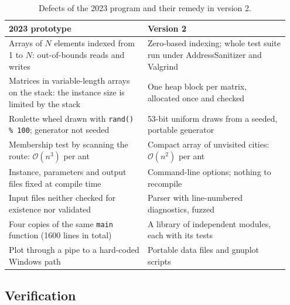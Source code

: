 \documentclass[11pt,a4paper]{article}
\newcommand{\code}[1]{\texttt{#1}}
\newcommand{\bigO}{\mathcal{O}}
\begin{document}
\begin{table}[htbp]
    \centering
    \caption{Defects of the 2023 program and their remedy in version 2.}
    \label{tab:rewrite}
    \small
    \begin{tabular}{@{}p{0.47\linewidth}p{0.48\linewidth}@{}}
        \toprule
        2023 prototype & Version 2                                                                     \\
        \midrule
        Arrays of $N$ elements indexed from 1 to $N$: out-of-bounds reads and writes
                       & Zero-based indexing; whole test suite run under AddressSanitizer and Valgrind \\[3pt]
        Matrices in variable-length arrays on the stack: the instance size is limited by the stack
                       & One heap block per matrix, allocated once and checked                         \\[3pt]
        Roulette wheel drawn with \code{rand() \% 100}; generator not seeded
                       & 53-bit uniform draws from a seeded, portable generator                        \\[3pt]
        Membership test by scanning the route: $\bigO(n^3)$ per ant
                       & Compact array of unvisited cities: $\bigO(n^2)$ per ant                       \\[3pt]
        Instance, parameters and output files fixed at compile time
                       & Command-line options; nothing to recompile                                    \\[3pt]
        Input files neither checked for existence nor validated
                       & Parser with line-numbered diagnostics, fuzzed                                 \\[3pt]
        Four copies of the same \code{main} function (1600 lines in total)
                       & A library of independent modules, each with its tests                         \\[3pt]
        Plot through a pipe to a hard-coded Windows path
                       & Portable data files and gnuplot scripts                                       \\
        \bottomrule
    \end{tabular}
\end{table}

\subsection{Verification}
\end{document}
